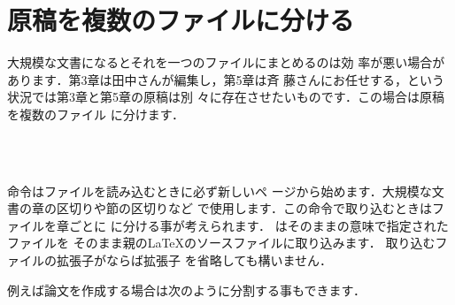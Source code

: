 \section{原稿を複数のファイルに分ける}%
大規模な文書になるとそれを一つのファイルにまとめるのは効
率が悪い場合があります．第3章は田中さんが編集し，第5章は斉
藤さんにお任せする，という状況では第3章と第5章の原稿は別
々に存在させたいものです．この場合は原稿を複数のファイル
に分けます．
\begin{Syntax}
\\
 \\
\end{Syntax}
命令はファイルを読み込むときに必ず新しいペ
ージから始めます．大規模な文書の章の区切りや節の区切りなど
で使用します．この命令で取り込むときはファイルを章ごとに
に分ける事が考えられます．
はそのままの意味で指定されたファイルを
そのまま親の{\LaTeX}のソースファイルに取り込みます．
取り込むファイルの拡張子がならば拡張子
を省略しても構いません．

例えば論文を作成する場合は次のように分割する事もできます．


